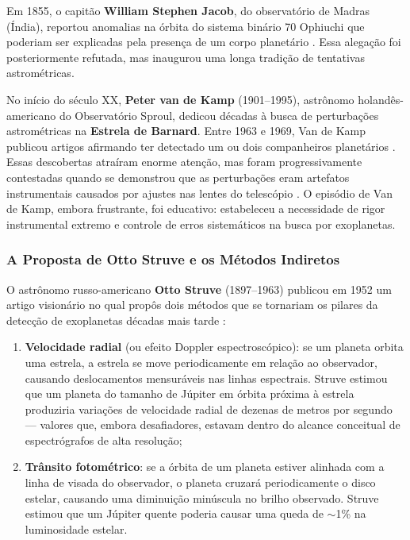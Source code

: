 \documentclass[
	12pt,
	openany,
	oneside,
	a4paper,
	english,
	brazil
]{abntex2}
\begin{document}
Em 1855, o capitão \textbf{William Stephen Jacob}, do observatório de Madras (Índia), reportou anomalias na órbita do sistema binário 70 Ophiuchi que poderiam ser explicadas pela presença de um corpo planetário \cite{jacob1855}. Essa alegação foi posteriormente refutada, mas inaugurou uma longa tradição de tentativas astrométricas.

No início do século XX, \textbf{Peter van de Kamp} (1901--1995), astrônomo holandês-americano do Observatório Sproul, dedicou décadas à busca de perturbações astrométricas na \textbf{Estrela de Barnard}. Entre 1963 e 1969, Van de Kamp publicou artigos afirmando ter detectado um ou dois companheiros planetários \cite{vandekamp1963}. Essas descobertas atraíram enorme atenção, mas foram progressivamente contestadas quando se demonstrou que as perturbações eram artefatos instrumentais causados por ajustes nas lentes do telescópio \cite{gatewood1973}. O episódio de Van de Kamp, embora frustrante, foi educativo: estabeleceu a necessidade de rigor instrumental extremo e controle de erros sistemáticos na busca por exoplanetas.

\subsubsection{A Proposta de Otto Struve e os Métodos Indiretos}

O astrônomo russo-americano \textbf{Otto Struve} (1897--1963) publicou em 1952 um artigo visionário no qual propôs dois métodos que se tornariam os pilares da detecção de exoplanetas décadas mais tarde \cite{struve1952}:

\begin{enumerate}
  \item \textbf{Velocidade radial} (ou efeito Doppler espectroscópico): se um planeta orbita uma estrela, a estrela se move periodicamente em relação ao observador, causando deslocamentos mensuráveis nas linhas espectrais. Struve estimou que um planeta do tamanho de Júpiter em órbita próxima à estrela produziria variações de velocidade radial de dezenas de metros por segundo --- valores que, embora desafiadores, estavam dentro do alcance conceitual de espectrógrafos de alta resolução;

  \item \textbf{Trânsito fotométrico}: se a órbita de um planeta estiver alinhada com a linha de visada do observador, o planeta cruzará periodicamente o disco estelar, causando uma diminuição minúscula no brilho observado. Struve estimou que um Júpiter quente poderia causar uma queda de $\sim$1\% na luminosidade estelar.
\end{enumerate}
\end{document}
